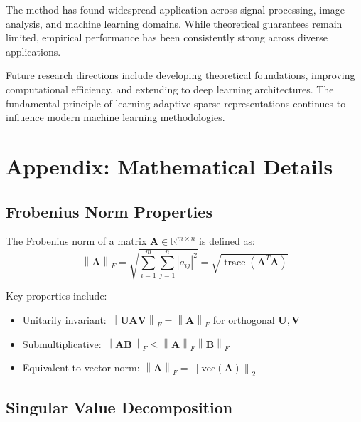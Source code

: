 \documentclass[12pt]{article}
\DeclareMathOperator{\trace}{trace}
\newcommand{\norm}[1]{\left\|#1\right\|}
\newcommand{\R}{\mathbb{R}}
\theoremstyle{definition}
\begin{document}
The method has found widespread application across signal processing, image analysis, and machine learning domains. While theoretical guarantees remain limited, empirical performance has been consistently strong across diverse applications.

Future research directions include developing theoretical foundations, improving computational efficiency, and extending to deep learning architectures. The fundamental principle of learning adaptive sparse representations continues to influence modern machine learning methodologies.

\begin{center}
\end{center}


\newpage

\section{Appendix: Mathematical Details}

\subsection{Frobenius Norm Properties}

The Frobenius norm of a matrix $\mathbf{A} \in \R^{m \times n}$ is defined as:
\begin{equation}
    \norm{\mathbf{A}}_F = \sqrt{\sum_{i=1}^m \sum_{j=1}^n |a_{ij}|^2} = \sqrt{\trace(\mathbf{A}^T\mathbf{A})}
\end{equation}

Key properties include:
\begin{itemize}
    \item Unitarily invariant: $\norm{\mathbf{U}\mathbf{A}\mathbf{V}}_F = \norm{\mathbf{A}}_F$ for orthogonal $\mathbf{U}, \mathbf{V}$
    \item Submultiplicative: $\norm{\mathbf{A}\mathbf{B}}_F \leq \norm{\mathbf{A}}_F \norm{\mathbf{B}}_F$
    \item Equivalent to vector norm: $\norm{\mathbf{A}}_F = \norm{\text{vec}(\mathbf{A})}_2$
\end{itemize}

\subsection{Singular Value Decomposition}
\end{document}
